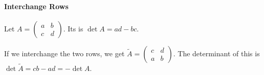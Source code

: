 \paragraph{Interchange Rows}
Let $A =
\begin{pmatrix}
  a & b \\
  c & d
\end{pmatrix}
$.
Its  is $\det A = ad - bc$.

If we interchange the two rows, we get $\tilde{A} =
\begin{pmatrix}
  c & d \\
  a & b
\end{pmatrix}$.
The determinant of this is $\det \tilde{A} = cb - ad = -\det A$.


